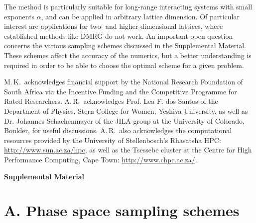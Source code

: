 \documentclass[aps,prl,showpacs,amsmath,amssymb,superscriptaddress,reprint,10pt]{revtex4-1}
\newcommand{\ar}[1]{{\color{analabha} #1}}
\begin{document}
The method is particularly suitable for long-range interacting systems with small exponents $\alpha$, and can be applied in arbitrary lattice dimension. Of particular interest are applications for two- and higher-dimensional lattices, where established methods like DMRG do not work. An important open question concerns the various sampling schemes discussed in the Supplemental Material. These schemes affect the accuracy of the numerics, but a better understanding is required in order to be able to choose the optimal scheme for a given problem.




M.\,K.\ acknowledges financial support by the National Research Foundation of South Africa via the Incentive Funding and the Competitive Programme for Rated Researchers. \ar{ A.\,R.\ acknowledges Prof. Lea F. dos Santos of the Department of Physics, Stern College for Women, Yeshiva University, as well as Dr. Johannes Schachenmayer of the JILA group at the University of Colorado, Boulder, for useful discussions. A.\,R.\ also acknowledges the computational resources provided by the University of Stellenbosch's Rhasatsha HPC: \url{http://www.sun.ac.za/hpc}, as well as the Tsessebe cluster at the Centre for High Performance Computing, Cape Town: \url{http://www.chpc.ac.za/}.}




\bigskip

\newpage

\begin{center}
{\bf Supplemental Material}  
\end{center}
\vspace{-3mm}
\appendix
{}


\section{A. Phase space sampling schemes}
\setcounter{section}{1}
\setcounter{equation}{0}
\setcounter{figure}{0}
\end{document}
